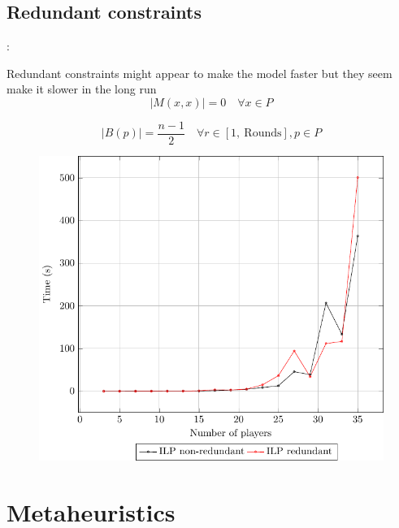 \documentclass[9pt, aspectratio=169, xcolor=table]{beamer}
\begin{document}
\subsection{Redundant constraints}
\begin{frame}{\secname: \subsecname}
    \begin{minipage}{0.40\textwidth}
	Redundant constraints might appear to make the model faster but they seem make it slower in the long run
	\begin{equation*}
	    \label{noselfplay}
	    |M(x,x)| = 0 \quad \forall x \in P 
	\end{equation*}

	\begin{equation*}
	    \label{blackfairness}
	    |B(p)| = \frac{n-1}{2} \quad \forall r \in [1, \ \text{Rounds}], p \in P
	\end{equation*}

    \end{minipage}
    \hfill
    \begin{minipage}{0.57\textwidth}
	\begin{figure}[h]
	    \includegraphics[width=\linewidth]{../plots/time_per_instance.pdf}
	\end{figure}
    \end{minipage}

\end{frame}

\section{Metaheuristics}
\end{document}
